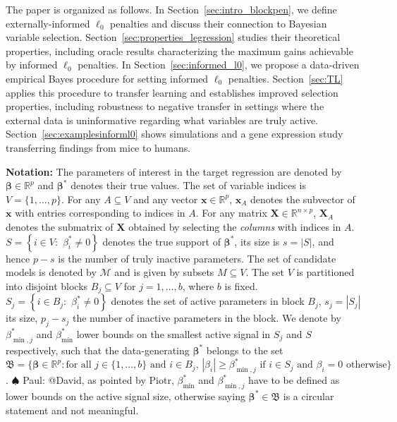 \documentclass[
  12pt]{article}
\newcommand{\paul}[1]{{\small{\color{green} \sf $\spadesuit$ Paul: #1}}}
\newcommand{\R}{\mathbb{R}}
\newcommand{\M}{\mathcal{M}}
\newcommand{\bx}{\mathbf{x}}
\newcommand{\bbeta}{\boldsymbol{\beta}}
\newcommand{\bX}{\mathbf{X}}
\begin{document}
The paper is organized as follows.
In Section~\ref{sec:intro_blockpen}, we define externally-informed $\ell_0$ penalties and discuss their connection to Bayesian variable selection.
Section~\ref{sec:properties_legression} studies their theoretical properties, including oracle results characterizing the maximum gains achievable by informed $\ell_0$ penalties. In Section~\ref{sec:informed_l0}, we propose a data-driven empirical Bayes procedure for setting informed $\ell_0$ penalties.
Section~\ref{sec:TL} applies this procedure to transfer learning and establishes improved selection properties, including robustness to negative transfer in settings where the external data is uninformative regarding what variables are truly active.
Section~\ref{sec:examplesinforml0} shows simulations and a gene expression study transferring findings from mice to humans.

\textbf{Notation:}
The parameters of interest in the target regression are denoted by $\bbeta\in \R^p$  
and $\bbeta^*$ denotes their true values. The set of variable indices is $V=\{1,\ldots,p\}$. For any $A\subseteq V$ and any vector $\bx\in \R^p$, $\bx_A$ denotes the subvector of $\bx$ with entries corresponding to indices in $A$. For any matrix $\bX \in \R^{n\times p}$, $\bX_A$ denotes the submatrix of $\bX$ obtained by selecting the \emph{columns} with indices in $A$. $S=\left\{i\in V:\,\,  \beta^*_i \neq 0 \right\}$ denotes the true support of $\bbeta^*$, its size is $s=|S|$, and hence $p-s$ is the number of truly inactive parameters. The set of candidate models is denoted by $\M$ and is given by subsets $M\subseteq V$. The set $V$ is partitioned into disjoint blocks $B_j \subseteq V$ for $j=1,\ldots,b$, where $b$ is fixed. $S_j=\left\{i\in B_j:\,\,  \beta^*_i \neq 0\right\}$ denotes the set of active parameters in block $B_j$, $s_j=|S_j|$ its size, $p_j-s_j$ the number of inactive parameters in the block. \color{green}We denote by $\beta_{\min,j}^*$ and $\beta_{\min}^*$ lower bounds on the smallest active signal in $S_j$ and $S$ respectively, such that \color{black}
the data-generating $\bbeta^*$ belongs to the set $\mathfrak{B}=\{\bbeta \in \R^p: \text{for all }j \in \{1,\ldots,b\} \text{ and }i \in B_j,\, |\beta_i|\geq  \beta^*_{\min,j} \text{ if } i\in S_j \text{ and }  \beta_i= 0 \text{ otherwise}\}$.\paul{@David, as pointed by Piotr, $\beta_{\min}^*$ and $\beta_{\min,j}^*$ have to be defined as lower bounds on the active signal size, otherwise saying $\bbeta^*\in\mathfrak{B}$ is a circular statement and not meaningful.}
\end{document}
